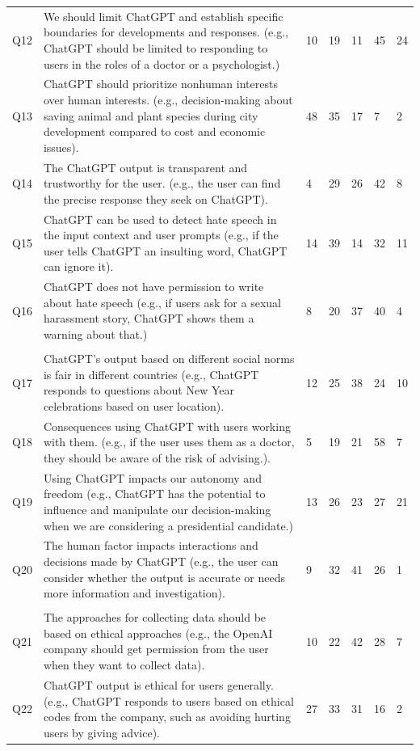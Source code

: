 \documentclass[sigconf]{acmart}
\begin{document}
\begin{longtable}{p{0.6cm}p{9cm}p{1.2cm}p{1cm}p{1cm}p{1cm}p{1cm}}
\addlinespace[0.5em]
\hline
\multicolumn{7}{l}{\textbf{Toxicity}} \\
\hline
Q12 & We should limit ChatGPT and establish specific boundaries for developments and responses. (e.g., ChatGPT should be limited to responding to users in the roles of a doctor or a psychologist.) & 10 & 19 & 11 & 45 & 24 \\
Q13 & ChatGPT should prioritize nonhuman interests over human interests. (e.g., decision-making about saving animal and plant species during city development compared to cost and economic issues). & 48 & 35 & 17 & 7 & 2 \\
Q14 & The ChatGPT output is transparent and trustworthy for the user. (e.g., the user can find the precise response they seek on ChatGPT). & 4 & 29 & 26 & 42 & 8 \\
Q15 & ChatGPT can be used to detect hate speech in the input context and user prompts (e.g., if the user tells ChatGPT an insulting word, ChatGPT can ignore it). & 14 & 39 & 14 & 32 & 11 \\
Q16 & ChatGPT does not have permission to write about hate speech (e.g., if users ask for a sexual harassment story, ChatGPT shows them a warning about that.) & 8 & 20 & 37 & 40 & 4 \\
\addlinespace[0.5em]
\hline
\multicolumn{7}{l}{\textbf{Social Norms}} \\
\hline
Q17 & ChatGPT's output based on different social norms is fair in different countries (e.g., ChatGPT responds to questions about New Year celebrations based on user location). & 12 & 25 & 38 & 24 & 10 \\
Q18 & Consequences using ChatGPT with users working with them. (e.g., if the user uses them as a doctor, they should be aware of the risk of advising.). & 5 & 19 & 21 & 58 & 7 \\
Q19 & Using ChatGPT impacts our autonomy and freedom (e.g., ChatGPT has the potential to influence and manipulate our decision-making when we are considering a presidential candidate.) & 13 & 26 & 23 & 27 & 21 \\
Q20 & The human factor impacts interactions and decisions made by ChatGPT (e.g., the user can consider whether the output is accurate or needs more information and investigation). & 9 & 32 & 41 & 26 & 1 \\
\addlinespace[0.5em]
\hline
\multicolumn{7}{l}{\textbf{Ethics}} \\
\hline
Q21 & The approaches for collecting data should be based on ethical approaches (e.g., the OpenAI company should get permission from the user when they want to collect data). & 10 & 22 & 42 & 28 & 7 \\
Q22 & ChatGPT output is ethical for users generally. (e.g., ChatGPT responds to users based on ethical codes from the company, such as avoiding hurting users by giving advice). & 27 & 33 & 31 & 16 & 2 \\

\end{longtable}



\end{document}
